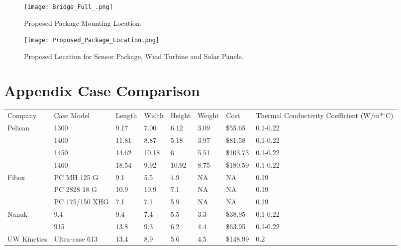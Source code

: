 \begin{figure}[ht]
\centering
\texttt{[image: Bridge\_Full\_.png]}
\caption{Proposed Package Mounting Location.}
\label{fig:PackageLocation}
\end{figure}


\begin{figure}[ht]
\centering
\texttt{[image: Proposed\_Package\_Location.png]}
\caption{Proposed Location for Sensor Package, Wind Turbine and Solar Panels.}
\label{fig:Proposed Package, Panels and Turbine Location}
\end{figure}




\section{Appendix Case Comparison}
\begin{table}[h]
\begin{tabular}{lllllllp{3cm}}
Company   & Case Model   & Length & Width & Height & Weight & Cost   & Thermal Conductivity Coefficient (W/m*$^{\circ}$C) \\
Pelican   & 1300      & 9.17  & 7.00 & 6.12  & 3.09  & \$55.65 & 0.1-0.22                       \\
~      & 1400      & 11.81 & 8.87 & 5.18  & 3.97  & \$81.58 & 0.1-0.22                       \\
~      & 1450      & 14.62 & 10.18 & 6   & 5.51  & \$103.73 & 0.1-0.22                       \\
~      & 1460      & 18.54 & 9.92 & 10.92 & 8.75  & \$180.59 & 0.1-0.22                       \\
Fibox    & PC MH 125 G  & 9.1  & 5.5  & 4.9  & NA   & NA    & 0.19                         \\
~      & PC 2828 18 G  & 10.9  & 10.9 & 7.1  & NA   & NA    & 0.19                         \\
~      & PC 175/150 XHG & 7.1  & 7.1  & 5.9  & NA   & NA    & 0.19                         \\
Nanuk    & 9.4      & 9.4  & 7.4  & 5.5  & 3.3  & \$38.95 & 0.1-0.22                       \\
~      & 915      & 13.8  & 9.3  & 6.2  & 4.4  & \$63.95 & 0.1-0.22                       \\
UW Kinetics & Ultra-case 613 & 13.4  & 8.9  & 5.6  & 4.5  & \$148.99 & 0.2                         \\
\end{tabular}
\end{table}
